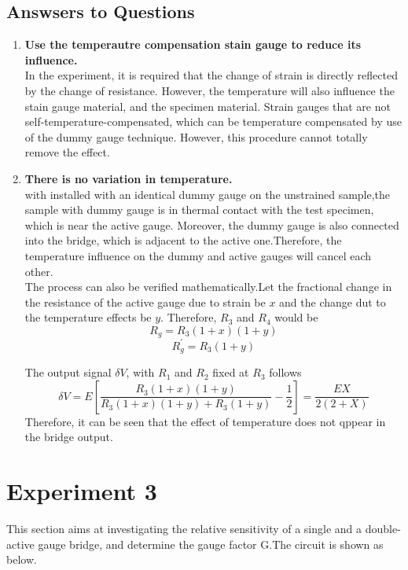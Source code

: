 \documentclass[11pt,a4paper,twoside]{article}
\begin{document}
\subsection{Answsers to Questions}
\begin{enumerate}
\item
\textbf{Use the temperautre compensation stain gauge to reduce its influence.}\\
In the experiment, it is required that the change of strain is directly reflected by the change of resistance. However, the temperature will also influence the stain gauge material, and the specimen material. Strain gauges that are not self-temperature-compensated, which can be temperature compensated by use of the dummy gauge technique. However, this procedure cannot totally remove the effect.

\item 
\textbf{There is no variation in temperature.} \\
with installed with an identical dummy gauge on the unstrained sample,the sample with dummy gauge is in thermal contact with the test specimen, which is near the active gauge. Moreover, the dummy gauge is also connected into the bridge, which is adjacent to the active one.Therefore, the temperature influence on the dummy and active gauges will cancel each other.\\

The process can also be verified mathematically.Let the fractional change in the resistance of the active gauge due to strain be $x$ and the change dut to the temperature effects be $y$. Therefore, $R_{3}$ and  $R_{4}$ would be 
		\begin{equation}
		R_{g}=R_{3}(1+x)(1+y) 
		\end{equation}
		\begin{equation}
		R_{g}^{'}=R_{3}(1+y) 
		\end{equation}
		
The output signal $\delta V $, with  $R_{1}$ and  $R_{2}$ fixed at $R_{3}$ follows
	\begin{equation}
	\delta V = E \left[\frac{R_{3}(1+x)(1+y)}{R_{3}(1+x)(1+y)+R_{3}(1+y) }- \frac{1}{2} \right ]=\frac{EX}{2(2+X)}
	\end{equation}
Therefore, it can be seen that the effect of temperature does not qppear in the bridge output. 
\end{enumerate}

\section{Experiment 3}
This section aims at investigating the relative sensitivity of a single and a double-active gauge bridge, and determine the gauge factor G.The circuit is shown as below. 
\end{document}
